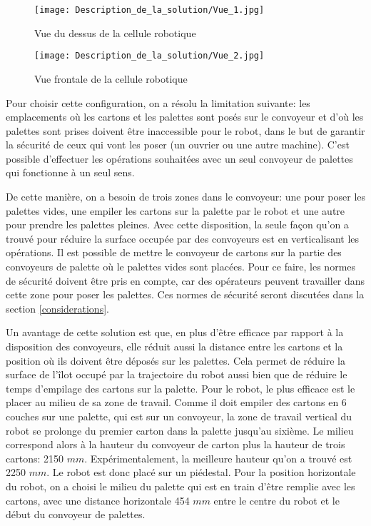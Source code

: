 \begin{figure}[H]
	\begin{center}	
		\texttt{[image: Description\_de\_la\_solution/Vue\_1.jpg]}
		\caption{Vue du dessus de la cellule robotique}
		\label{fig:Vue_1}
	\end{center}
\end{figure}
\pagebreak
\begin{figure}[H]
	\begin{center}	
		\texttt{[image: Description\_de\_la\_solution/Vue\_2.jpg]}
		\caption{Vue frontale de la cellule robotique}
		\label{fig:Vue_2}
	\end{center}
\end{figure}


Pour choisir cette configuration, on a résolu la limitation suivante: les emplacements où les cartons et les palettes sont posés sur le convoyeur et d’où les palettes sont prises doivent être inaccessible pour le robot, dans le but de garantir la sécurité de ceux qui vont les poser (un ouvrier ou une autre machine). C’est possible d’effectuer les opérations souhaitées avec un seul convoyeur de palettes qui fonctionne à un seul sens. \par De cette manière, on a besoin de trois zones dans le convoyeur: une pour poser les palettes vides, une empiler les cartons sur la palette par le robot et une autre pour prendre les palettes pleines. Avec cette disposition, la seule façon qu’on a trouvé pour réduire la surface occupée par des convoyeurs est en verticalisant les opérations. Il est possible de mettre le convoyeur de cartons sur la partie des convoyeurs de palette où le palettes vides sont placées. Pour ce faire, les normes de sécurité doivent être pris en compte, car des opérateurs peuvent travailler dans cette zone pour poser les palettes. Ces normes de sécurité seront discutées dans la section \ref{considerations}. 

Un avantage de cette solution est que, en plus d’être efficace par rapport à la disposition des convoyeurs, elle réduit aussi la distance entre les cartons et la position où ils doivent être déposés sur les palettes. Cela permet de réduire la surface de l’îlot occupé par la trajectoire du robot aussi bien que de réduire le temps d’empilage des cartons sur la palette.
Pour le robot, le plus efficace est le placer au milieu de sa zone de travail. Comme il doit empiler des cartons en 6 couches sur une palette, qui est sur un convoyeur, la zone de travail vertical du robot se prolonge du premier carton dans la palette jusqu’au sixième. Le milieu correspond alors à la hauteur du convoyeur de carton plus la hauteur de trois cartons: 2150 $ mm $. Expérimentalement, la meilleure hauteur qu’on a trouvé est 2250 $ mm $. Le robot est donc placé sur un piédestal.
Pour la position horizontale du robot, on a choisi le milieu du palette qui est en train d’être remplie avec les cartons, avec une distance horizontale 454 $ mm $ entre le centre du robot et le début du convoyeur de palettes.

